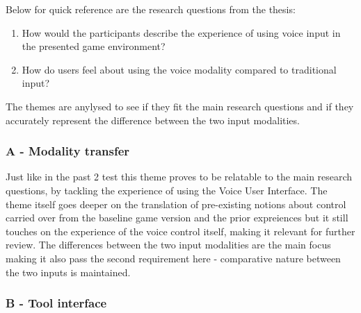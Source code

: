 Below for quick reference are the research questions from the thesis: 

\begin{enumerate}
    \item How would the participants describe the experience of using voice input in the presented
game environment?
    \item How do users feel about using the voice modality compared to traditional input?
\end{enumerate}

The themes are anylysed to see if they fit the main research questions and if they accurately represent the difference between the two input modalities.

\subsubsection{A - Modality transfer}



Just like in the past 2 test this theme proves to be relatable to the main research questions, by tackling the experience of using the Voice User Interface. The theme itself goes deeper on the translation of pre-existing notions about control carried over from the baseline game version and the prior expreiences but it still touches on the experience of the voice control itself, making it relevant for further review. The differences between the two input modalities are the main focus making it also pass the second requirement here - comparative nature between the two inputs is maintained.

\subsubsection{B - Tool interface}


